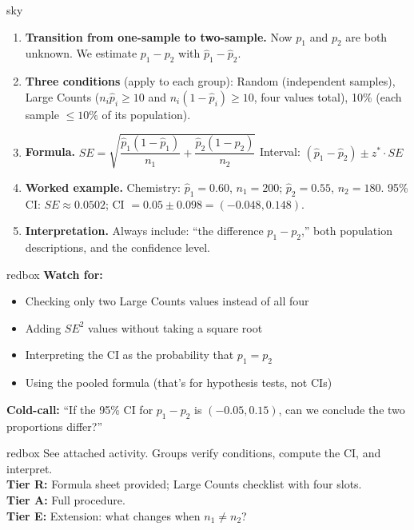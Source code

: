 \documentclass[10pt]{article}
\begin{document}
\begin{skillbox}[Lesson]{sky}
    \begin{enumerate}[leftmargin=1.4em, label=\arabic*.]
        \item \textbf{Transition from one-sample to two-sample.} Now $p_1$ and $p_2$ are both
              unknown. We estimate $p_1 - p_2$ with $\hat p_1 - \hat p_2$.

        \item \textbf{Three conditions} (apply to each group):
              Random (independent samples), Large Counts ($n_i\hat p_i \ge 10$ and $n_i(1-\hat p_i) \ge 10$,
              four values total), 10\% (each sample $\le 10\%$ of its population).

        \item \textbf{Formula.}
              $SE = \sqrt{\dfrac{\hat p_1(1-\hat p_1)}{n_1} + \dfrac{\hat p_2(1-\hat p_2)}{n_2}}$
              Interval: $(\hat p_1 - \hat p_2) \pm z^* \cdot SE$

        \item \textbf{Worked example.} Chemistry: $\hat p_1=0.60$, $n_1=200$; $\hat p_2=0.55$, $n_2=180$.
              95\% CI: $SE \approx 0.0502$; CI $= 0.05 \pm 0.098 = (-0.048, 0.148)$.

        \item \textbf{Interpretation.} Always include: ``the difference $p_1 - p_2$,'' both
              population descriptions, and the confidence level.
    \end{enumerate}
\end{skillbox}

\begin{skillbox}{redbox}
    \textbf{Watch for:}
    \begin{itemize}[leftmargin=1.2em]
        \item Checking only two Large Counts values instead of all four
        \item Adding $SE^2$ values without taking a square root
        \item Interpreting the CI as the probability that $p_1=p_2$
        \item Using the pooled formula (that's for hypothesis tests, not CIs)
    \end{itemize}
    \textbf{Cold-call:} ``If the 95\% CI for $p_1-p_2$ is $(-0.05, 0.15)$, can we conclude
    the two proportions differ?''
\end{skillbox}

\begin{skillbox}{redbox}
    See attached activity. Groups verify conditions, compute the CI, and interpret.\\[4pt]
    \textbf{Tier R:} Formula sheet provided; Large Counts checklist with four slots.\\
    \textbf{Tier A:} Full procedure.\\
    \textbf{Tier E:} Extension: what changes when $n_1 \ne n_2$?
\end{skillbox}
\end{document}
